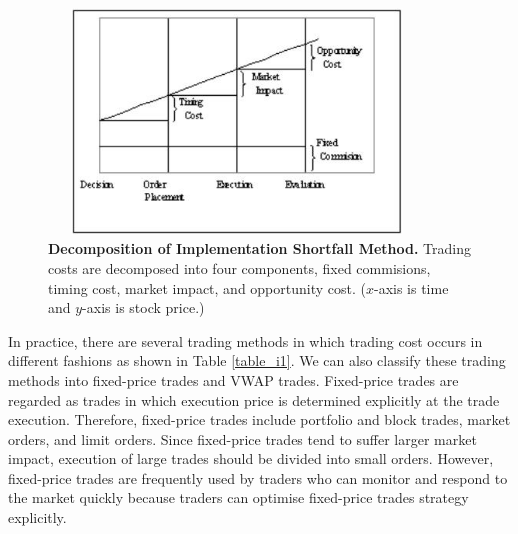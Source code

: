\begin{figure}[htbp]
\begin{center}
 \includegraphics[width=10cm,height=6cm]{fg_i0n.png}
\end{center}
\caption[Decomposition of Implementation Shortfall Method]{{\bf Decomposition of Implementation Shortfall Method.}
\quad Trading costs are decomposed into four components, fixed commisions, timing cost, market impact, and opportunity cost.  ($x$-axis is time and $y$-axis is stock price.)}\label{fg_i0}
\end{figure}

In practice, there are several trading methods in which trading cost occurs in different fashions as shown in Table \ref{table_i1}.  We can also classify these trading methods into fixed-price trades and VWAP trades.  Fixed-price trades are regarded as trades in which execution price is determined explicitly at the trade execution.  Therefore, fixed-price trades include portfolio and block trades, market orders, and limit orders.  Since fixed-price trades tend to suffer larger market impact, execution of large trades should be divided into small orders.  However, fixed-price trades are frequently used by traders who can monitor and respond to the market quickly because traders can optimise fixed-price trades strategy explicitly.

